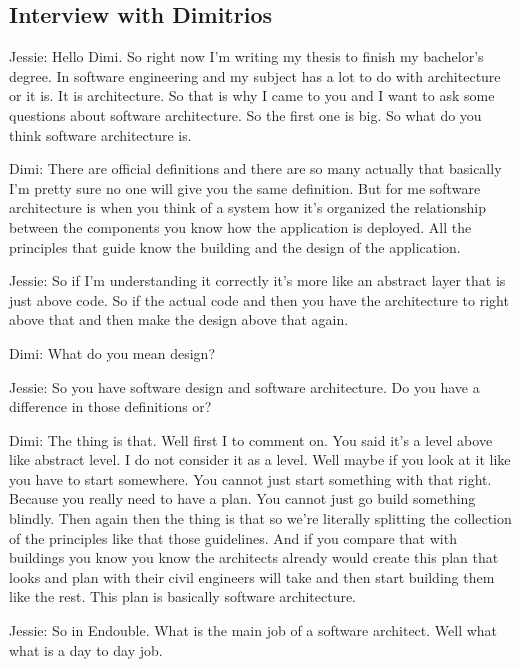 \subsection{Interview with Dimitrios}

Jessie: Hello Dimi. So right now I'm writing my thesis to finish my bachelor's degree. In software engineering and my subject has a lot to do with architecture or it is. It is architecture. So that is why I came to you and I want to ask some questions about software architecture. So the first one is big. So what do you think software architecture is.

Dimi: There are official definitions and there are so many actually that basically I'm pretty sure no one will give you the same definition. But for me software architecture is when you think of a system how it's organized the relationship between the components you know how the application is deployed. All the principles that guide know the building and the design of the application.

Jessie: So if I'm understanding it correctly it's more like an abstract layer that is just above code. So if the actual code and then you have the architecture to right above that and then make the design above that again.

Dimi: What do you mean design?

Jessie: So you have software design and software architecture. Do you have a difference in those definitions or?

Dimi: The thing is that. Well first I to comment on. You said it's a level above like abstract level. I do not consider it as a level. Well maybe if you look at it like you have to start somewhere. You cannot just start something with that right. Because you really need to have a plan. You cannot just go build something blindly. Then again then the thing is that so we're literally splitting the collection of the principles like that those guidelines. And if you compare that with buildings you know you know the architects already would create this plan that looks and plan with their civil engineers will take and then start building them like the rest. This plan is basically software architecture.

Jessie: So in Endouble. What is the main job of a software architect. Well what what is a day to day job.

